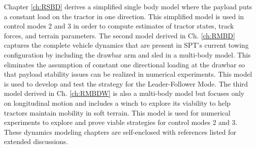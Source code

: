 Chapter \ref{ch:RSBD} derives a simplified single body model where the payload puts a constant load on the tractor in one direction. This simplified model is used in control modes 2 and 3 in order to compute estimates of tractor states, track forces, and terrain parameters. The second model derived in Ch. \ref{ch:RMBD} captures the complete vehicle dynamics that are present in SPT's current towing configuration by including the drawbar arm and sled in a multi-body model. This eliminates the assumption of constant one directional loading at the drawbar so that payload stability issues can be realized in numerical experiments. This model is used to develop and test the strategy for the Leader-Follower Mode. The third model derived in Ch. \ref{ch:RMBDW} is also a multi-body model but focuses only on longitudinal motion and includes a winch to explore its viability to help tractors maintain mobility in soft terrain. This model is used for numerical experiments to explore and prove viable strategies for control modes 2 and 3. These dynamics modeling chapters are self-enclosed with references listed for extended discussions. 

